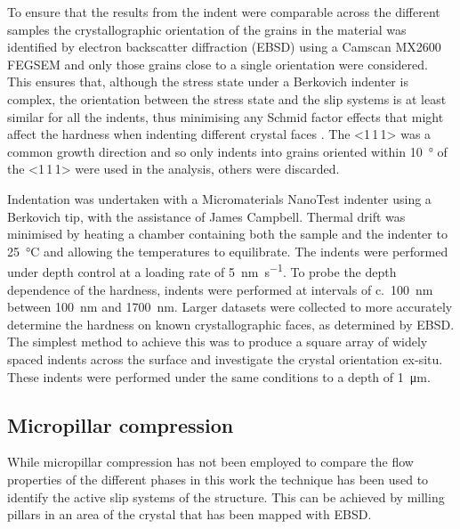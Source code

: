 



To ensure that the results from the indent were comparable across the different samples the crystallographic orientation of the grains in the material was identified by electron backscatter diffraction (EBSD) using a Camscan MX2600 FEGSEM and only those grains close to a single orientation were considered. This ensures that, although the stress state under a Berkovich indenter is complex, the orientation between the stress state and the slip systems is at least similar for all the indents, thus minimising any Schmid factor effects that might affect the hardness when indenting different crystal faces \cite{Kelly2012ch7}. The <1\,1\,1> was a common growth direction and so only indents into grains oriented within \SI{10}{\degree} of the <1\,1\,1> were used in the analysis, others were discarded.


Indentation was undertaken with a Micromaterials NanoTest indenter using a Berkovich tip, with the assistance of James Campbell. Thermal drift was minimised by heating a chamber containing both the sample and the indenter to \SI{25}{\celsius} and allowing the temperatures to equilibrate. The indents were performed under depth control at a loading rate of \SI{5}{\nano\meter\per\second}. To probe the depth dependence of the hardness, indents were performed at intervals of c.~\SI{100}{\nano\meter} between \SI{100}{\nano\meter} and \SI{1700}{\nano\meter}. Larger datasets were collected to more accurately determine the hardness on known crystallographic faces, as determined by EBSD. The simplest method to achieve this was to produce a square array of widely spaced indents across the surface and investigate the crystal orientation ex-situ. These indents were performed under the same conditions to a depth of \SI{1}{\micro\meter}.


\subsection{Micropillar compression}

While micropillar compression has not been employed to compare the flow properties of the different phases in this work the technique has been used to identify the active slip systems of the  structure. This can be achieved by milling pillars in an area of the crystal that has been mapped with EBSD. 

